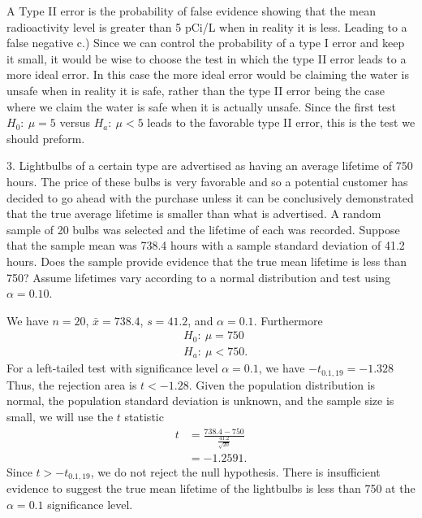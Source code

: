 \documentclass{report}
\begin{document}
\bigbreak \noindent 
A Type II error is the probability of false evidence showing that the mean radioactivity level is greater than 5 pCi/L when in reality it is less. Leading to a false negative
\bigbreak \noindent 
c.) Since we can control the probability of a type I error and keep it small, it would be wise to choose the test in which the type II error leads to a more ideal error. In this case the more ideal error would be claiming the water is unsafe when in reality it is safe, rather than the type II error being the case where we claim the water is safe when it is actually unsafe. Since the first test $H_{0}:\ \mu =5 $ versus $H_{a}:\ \mu < 5$ leads to the favorable type II error, this is the test we should preform.




\pagebreak \bigbreak \noindent 
\begin{mdframed}
3. Lightbulbs of a certain type are advertised as having an average lifetime of 750 hours. The price of these bulbs is very favorable and so a potential customer has decided to go ahead with the purchase unless it can be conclusively demonstrated that the true average lifetime is smaller than what is advertised. A random sample of 20 bulbs was selected and the lifetime of each was recorded. Suppose that the sample mean was 738.4 hours with a sample standard deviation of 41.2 hours. Does the sample provide evidence that the true mean lifetime is less than 750? Assume lifetimes vary according to a normal distribution and test using $\alpha = 0.10$.
\end{mdframed}
\bigbreak \noindent 
We have $n=20$, $\bar{x} = 738.4$, $s=41.2$, and $\alpha=0.1$. Furthermore
\begin{align*}
    &H_{0}:\ \mu = 750 \\
    &H_{a}:\ \mu < 750
.\end{align*}
\bigbreak \noindent 
For a left-tailed test with significance level $\alpha=0.1$, we have $-t_{0.1, 19}  = -1.328$ Thus, the rejection area is $t < -1.28 $. 
\bigbreak \noindent 
Given the population distribution is normal, the population standard deviation is unknown, and the sample size is small, we will use the $t$ statistic
\begin{align*}
    t &= \frac{738.4 - 750}{\frac{41.2}{\sqrt{20}}} \\
    &=-1.2591
.\end{align*}
Since $t > -t_{0.1,19} $, we do not reject the null hypothesis. There is insufficient evidence to suggest the true mean lifetime of the lightbulbs is less than 750 at the $\alpha=0.1$ significance level.
\end{document}
